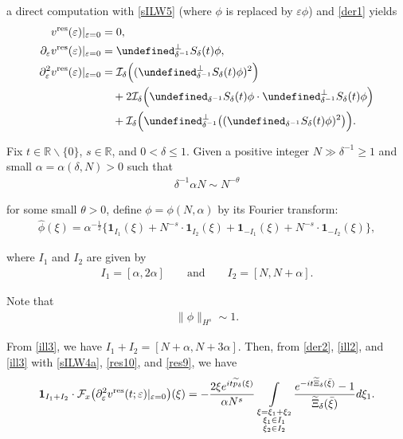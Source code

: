 \documentclass[letterpaper, 11pt,  reqno]{amsart}
\DeclareMathOperator*{\intt}{\int}
\newcommand{\1}{\hspace{0.5mm}\textup{I}\hspace{0.5mm}}
\newcommand{\I}{\mathcal{I}}
\newcommand{\noi}{\noindent}
\newcommand{\R}{\mathbb{R}}
\let\P= \undefined
\newcommand{\P}{\mathbf{P}}
\newcommand{\F}{\mathcal{F}}
\newcommand{\high}{\textup{res}}
\newcommand{\al}{\alpha}
\newcommand{\dl}{\delta}
\newcommand{\eps}{\varepsilon}
\newcommand{\ft}{\widehat}
\newcommand{\wt}{\widetilde}
\newcommand{\dd}{\partial}
\newcommand{\ta}{\theta}
\newcommand{\ind}{\mathbf 1}
\numberwithin{equation}{section}
\numberwithin{theorem}{section}
\begin{document}
\noi
a direct computation with \eqref{sILW5}
(where $\phi$ is replaced by $\eps \phi$)
and \eqref{der1}
yields
\begin{align}
\begin{split}
v^\high(\eps)|_{\eps = 0} & = 0, \\
\dd_\eps v^\high(\eps)|_{\eps = 0} 
& =  \P_{ \dl^{-1}}^\perp S_\dl(t) \phi,\\
\dd_\eps^2 v^\high(\eps)|_{\eps = 0} 
& = 
\I_\dl\Big( (\P_{ \dl^{-1}}^\perp S_\dl(t) \phi)^2\Big)\\
& \quad + 2 \I_\dl\Big( \P_{ \dl^{-1}} S_\dl(t) \phi \cdot \P_{ \dl^{-1}}^\perp S_\dl(t) \phi\Big)\\
& \quad + \I_\dl\Big( \P_{ \dl^{-1}}^\perp \big((\P_{ \dl^{-1}} S_\dl(t) \phi)^2\big)\Big).
\end{split}
\label{der2}
\end{align}







Fix \(t\in \R\backslash\{0\}\), $s \in \R$, and $0 < \dl \le 1$.
Given a positive integer $N \gg \dl^{-1} \ge 1$ and small  $\al = \al(\dl, N)> 0$ such that 
\begin{align}
\dl^{-1} \al N \sim N^{-\ta}
\label{ill1}
\end{align}


\noi
 for some small $\ta > 0$, 
 define $\phi = \phi(N, \al)$ by its Fourier transform:
 \begin{align}
\ft \phi (\xi) = \al^{-\frac 12 }
\Big\{\ind_{I_1}(\xi) 
+  N^{-s}\cdot \ind_{I_2}(\xi) + 
\ind_{-I_1}(\xi)  
+  N^{-s}\cdot \ind_{-I_2}(\xi) \Big\}, 
 \label{ill2}
 \end{align}
 
\noi
where $I_1$ and $I_2$ are given by 
\begin{align}
I_1 = [\al, 2\al]
\qquad \text{and}\qquad
I_2 = [N, N+\al].
\label{ill3}
\end{align}


\noi
Note that 
\begin{align}
\| \phi \|_{H^s} \sim 1.
\label{ill4}
\end{align}
 
 


From \eqref{ill3}, we have $I_1 + I_2 = [N + \al, N+3\al]$.
Then, from \eqref{der2}, \eqref{ill2}, and \eqref{ill3}
with \eqref{sILW4a}, \eqref{res10}, and \eqref{res9}, we have
\begin{align}
\begin{split}
 \ind_{I_1 + I_2} \cdot \F_x \big(\dd_\eps^2 v^\high(t; \eps)|_{\eps = 0} \big)
(\xi)
 =-  \frac{2\xi e^{i t \wt p_\dl(\xi)}}{\al N^s}
 \intt_{\substack{\xi = \xi_1+ \xi_2\\
 \xi_1 \in I_1\\\xi_2 \in I_2}}
 \frac{e^{-i t \wt \Xi_\dl(\bar \xi)} - 1}{\wt \Xi_\dl(\bar \xi)}
 d\xi_1 .
 \end{split}
\label{ill5}
\end{align}
\end{document}

